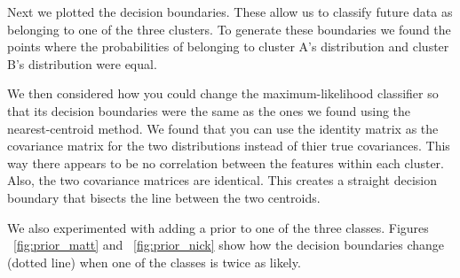 \documentclass[11pt, a4paper]{article}
\begin{document}
Next we plotted the decision boundaries. These allow us to classify future data as belonging to one of the three clusters. To generate these boundaries we found the points where the probabilities of belonging to cluster A's distribution and cluster B's distribution were equal.


We then considered how you could change the maximum-likelihood classifier so that its decision boundaries were the same as the ones we found using the nearest-centroid method. We found that you can use the identity matrix as the covariance matrix for the two distributions instead of thier true covariances. This way there appears to be no correlation between the features within each cluster. Also, the two covariance matrices are identical. This creates a straight decision boundary that bisects the line between the two centroids.


We also experimented with adding a prior to one of the three classes. Figures ~\ref{fig:prior_matt} and ~\ref{fig:prior_nick} show how the decision boundaries change (dotted line) when one of the classes is twice as likely.
\end{document}
